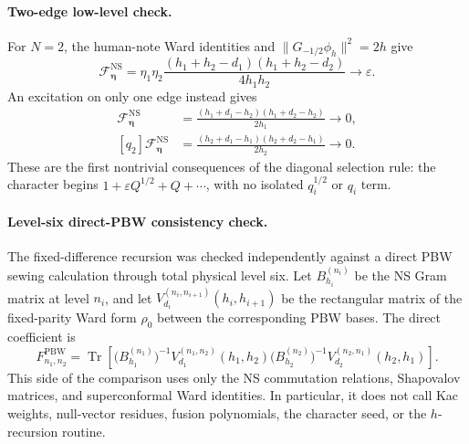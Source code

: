 \documentclass[11pt]{article}
\newcommand{\NS}{\mathrm{NS}}
\newcommand{\F}{\mathcal F}
\begin{document}
\paragraph{Two-edge low-level check.}
For \(N=2\), the human-note Ward identities and
\(\|G_{-1/2}\phi_h\|^2=2h\) give
\begin{equation}
 [q_1^{1/2}q_2^{1/2}]\F^{\NS}_{\boldsymbol\eta}
 =
 \eta_1\eta_2
 \frac{(h_1+h_2-d_1)(h_1+h_2-d_2)}{4h_1h_2}
 \longrightarrow\varepsilon.
 \label{eq:ns-necklace-half-level-check}
\end{equation}
An excitation on only one edge instead gives
\begin{align}
 [q_1]\F^{\NS}_{\boldsymbol\eta}
 &=
 \frac{(h_1+d_1-h_2)(h_1+d_2-h_2)}{2h_1}
 \longrightarrow0,
 \\
 [q_2]\F^{\NS}_{\boldsymbol\eta}
 &=
 \frac{(h_2+d_1-h_1)(h_2+d_2-h_1)}{2h_2}
 \longrightarrow0.
 \label{eq:ns-necklace-single-edge-check}
\end{align}
These are the first nontrivial consequences of the diagonal selection rule:
the character begins
\(1+\varepsilon Q^{1/2}+Q+\cdots\), with no isolated
\(q_i^{1/2}\) or \(q_i\) term.

\paragraph{Level-six direct-PBW consistency check.}
The fixed-difference recursion was checked independently against a direct
PBW sewing calculation through total physical level six.  Let
\(B_{h_i}^{(n_i)}\) be the NS Gram matrix at level \(n_i\), and let
\(V_{d_i}^{(n_i,n_{i+1})}(h_i,h_{i+1})\) be the rectangular matrix of the
fixed-parity Ward form \(\rho_0\) between the corresponding PBW bases.  The
direct coefficient is
\begin{equation}
 F^{\mathrm{PBW}}_{n_1,n_2}
 =
 \operatorname{Tr}\!\left[
 \bigl(B_{h_1}^{(n_1)}\bigr)^{-1}
 V_{d_1}^{(n_1,n_2)}(h_1,h_2)
 \bigl(B_{h_2}^{(n_2)}\bigr)^{-1}
 V_{d_2}^{(n_2,n_1)}(h_2,h_1)
 \right].
 \label{eq:ns-two-point-direct-pbw-coefficient}
\end{equation}
This side of the comparison uses only the NS commutation relations,
Shapovalov matrices, and superconformal Ward identities.  In particular,
it does not call Kac weights, null-vector residues, fusion polynomials, the
character seed, or the \(h\)-recursion routine.
\end{document}
